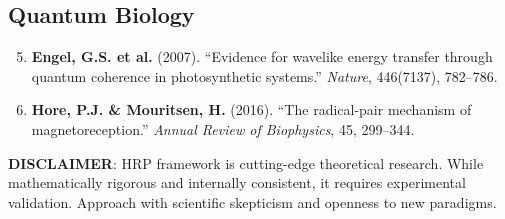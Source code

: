 \subsection*{Quantum Biology}

\begin{enumerate}
\setcounter{enumi}{4}
\item \textbf{Engel, G.S. et al.} (2007). ``Evidence for wavelike energy transfer through quantum coherence in photosynthetic systems.'' \emph{Nature}, 446(7137), 782--786.
\item \textbf{Hore, P.J. \& Mouritsen, H.} (2016). ``The radical-pair mechanism of magnetoreception.'' \emph{Annual Review of Biophysics}, 45, 299--344.
\end{enumerate}

\vspace{1em}

\begin{warningbox}
\textbf{DISCLAIMER}: HRP framework is cutting-edge theoretical research. While mathematically rigorous and internally consistent, it requires experimental validation. Approach with scientific skepticism and openness to new paradigms.
\end{warningbox}

